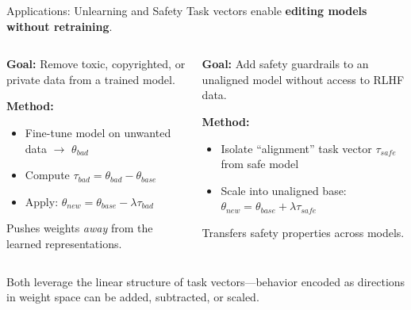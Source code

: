 \documentclass[aspectratio=169]{beamer}
\begin{document}
\begin{frame}{Applications: Unlearning and Safety}
  \small
  Task vectors enable \textbf{editing models without retraining}.

  \vspace{8pt}
  \begin{columns}[t]
      \begin{tcolorbox}[colback=AtlasWarm!10, colframe=AtlasWarm, boxrule=0.5pt, arc=2pt, boxsep=3pt, left=3pt, right=3pt, top=3pt, bottom=3pt, title={\footnotesize\textbf{Targeted Forgetting}}]
        \footnotesize
        \textbf{Goal:} Remove toxic, copyrighted, or private data from a trained model.

        \vspace{4pt}
        \textbf{Method:}
        \begin{itemize}[itemsep=1pt,topsep=2pt,label=$\triangleright$]
          \item Fine-tune model on unwanted data $\rightarrow$ $\theta_{bad}$
          \item Compute $\tau_{bad} = \theta_{bad} - \theta_{base}$
          \item Apply: $\theta_{new} = \theta_{base} - \lambda \tau_{bad}$
        \end{itemize}

        \vspace{4pt}
        Pushes weights \emph{away} from the learned representations.
      \end{tcolorbox}

      \begin{tcolorbox}[colback=AtlasCool!10, colframe=AtlasCool, boxrule=0.5pt, arc=2pt, boxsep=3pt, left=3pt, right=3pt, top=3pt, bottom=3pt, title={\footnotesize\textbf{Alignment without RLHF}}]
        \footnotesize
        \textbf{Goal:} Add safety guardrails to an unaligned model without access to RLHF data.

        \vspace{4pt}
        \textbf{Method:}
        \begin{itemize}[itemsep=1pt,topsep=2pt,label=$\triangleright$]
          \item Isolate ``alignment'' task vector $\tau_{safe}$ from safe model
          \item Scale into unaligned base: $\theta_{new} = \theta_{base} + \lambda \tau_{safe}$
        \end{itemize}

        \vspace{4pt}
        Transfers safety properties across models.
      \end{tcolorbox}
  \end{columns}

  \vspace{8pt}
  {\footnotesize\color{NoteGray} Both leverage the linear structure of task vectors---behavior encoded as directions in weight space can be added, subtracted, or scaled.}
\end{frame}
\end{document}
